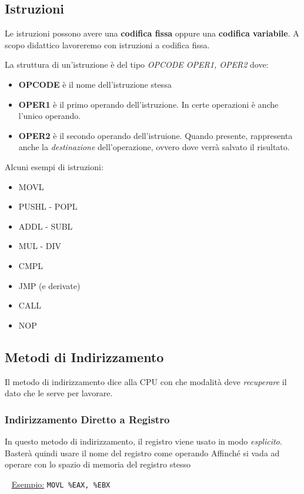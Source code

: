 \documentclass[12pt,oneside]{book}
\begin{document}
\subsection{Istruzioni}
Le istruzioni possono avere una \textbf{codifica fissa} oppure una \textbf{codifica variabile}.
A scopo didattico lavoreremo con istruzioni a codifica fissa.

\noindent La struttura di un'istruzione è del tipo \emph{OPCODE OPER1, OPER2} dove:
\begin{itemize}
    \item \textbf{OPCODE} è il nome dell'istruzione stessa
    \item \textbf{OPER1} è il primo operando dell'istruzione. In certe operazioni è anche l'unico operando.
    \item \textbf{OPER2} è il secondo operando dell'istruione. Quando presente, rappresenta anche la \emph{destinazione} dell'operazione, ovvero dove
          verrà salvato il risultato.
\end{itemize}

\noindent Alcuni esempi di istruzioni:
\begin{itemize}
    \item MOVL
    \item PUSHL - POPL
    \item ADDL - SUBL
    \item MUL - DIV
    \item CMPL
    \item JMP (e derivate)
    \item CALL
    \item NOP
\end{itemize}

\subsection{Metodi di Indirizzamento}
Il metodo di indirizzamento dice alla CPU con che modalità deve \emph{recuperare} il dato che le serve per lavorare.

\subsubsection{Indirizzamento Diretto a Registro}
In questo metodo di indirizzamento, il registro viene usato in modo \emph{esplicito}. Basterà quindi usare il nome del registro come operando Affinché
si vada ad operare con lo spazio di memoria del registro stesso

~\newline
\underline{Esempio:} \tabto{3cm} \texttt{MOVL \%EAX, \%EBX}
\end{document}
